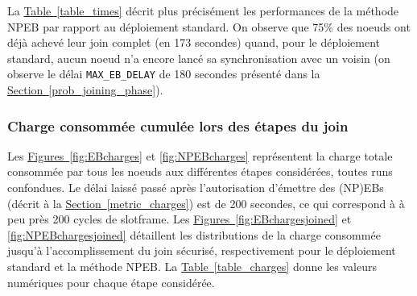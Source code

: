 \documentclass[]{report}
\newcommand{\wordlink}[2]{\hyperref[#2]{#1~\ref{#2}}}
\begin{document}
La \wordlink{Table}{table_times} décrit plus précisément les performances de la méthode NPEB par rapport au déploiement standard. On observe que 75\% des noeuds ont déjà achevé leur join complet (en 173 secondes) quand, pour le déploiement standard, aucun noeud n'a encore lancé sa synchronisation avec un voisin (on observe le délai \texttt{MAX\_EB\_DELAY} de 180 secondes présenté dans la \wordlink{Section}{prob_joining_phase}).



\subsubsection{Charge consommée cumulée lors des étapes du join}
\label{results_charges}

Les \wordlink{Figures}{fig:EBcharges} et \ref{fig:NPEBcharges} représentent la charge totale consommée par tous les noeuds aux différentes étapes considérées, toutes runs confondues. Le délai laissé passé après l'autorisation d'émettre des (NP)EBs (décrit à la \wordlink{Section}{metric_charges}) est de 200 secondes, ce qui correspond à à peu près 200 cycles de slotframe. Les \wordlink{Figures}{fig:EBchargesjoined} et \ref{fig:NPEBchargesjoined} détaillent les distributions de la charge consommée jusqu'à l'accomplissement du join sécurisé, respectivement pour le déploiement standard et la méthode NPEB. La \wordlink{Table}{table_charges} donne les valeurs numériques pour chaque étape considérée.

\vspace{0.2cm}
\end{document}
